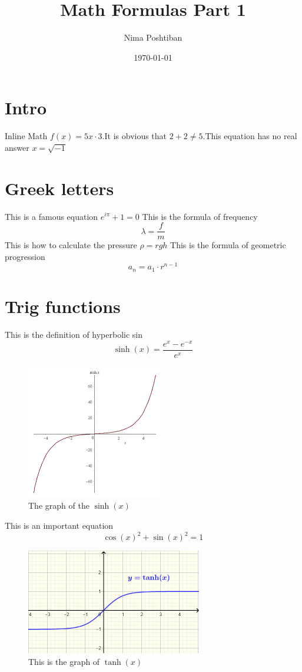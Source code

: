 \documentclass{article}
\author{Nima Poshtiban}
\date{\today}
\title{Math Formulas Part 1}
\begin{document}
	\maketitle
\tableofcontents
\listoffigures
\section{Intro}

Inline Math $f\left(x\right) = 5x \cdot 3$.\newline It is obvious that
$2 + 2 \neq  5$.\newline This equation has no real answer $ x = \sqrt{-1}$

\section{Greek letters}
This is a famous equation $e^{i\pi} + 1 = 0$\newline
This is the formula of frequency \[\lambda = \frac{f}{m}\] %
This is how to calculate the pressure $\rho = rgh$\newline
This is the formula of geometric progression \[
	a_{n} = a_{1} \cdot r^{n-1}
\]
\section{Trig functions}
This is the definition of hyperbolic sin \[
\sinh(x) = \frac{e^{x}-e^{-x}}{e^{x}}
\]
\begin{figure} %
\centering

	\includegraphics[scale=0.9]{sinhx.png} %
\caption{The graph of the $\sinh(x)$}
\end{figure}
This is an important equation
\[
\cos(x)^{2} + \sin(x)^{2} = 1
\]

\begin{figure}
	\centering
	\includegraphics[]{tanhx.png}
	\caption{This is the graph of $\tanh(x)$}
\end{figure}
\end{document}
